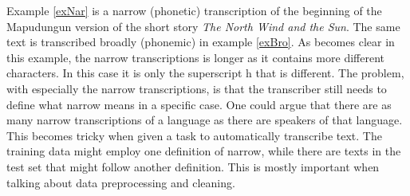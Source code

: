 Example \ref{exNar} is a narrow (phonetic) transcription of the beginning of the Mapudungun version of the short story \textit{The North Wind and the Sun}. The same text is transcribed broadly (phonemic) in example \ref{exBro}. As becomes clear in this example, the narrow transcriptions is longer as it contains more different characters. In this case it is only the superscript h that is different. The problem, with especially the narrow transcriptions, is that the transcriber still needs to define what narrow means in a specific case. One could argue that there are as many narrow transcriptions of a language as there are speakers of that language. This becomes tricky when given a task to automatically transcribe text. The training data might employ one definition of narrow, while there are texts in the test set that might follow another definition. This is mostly important when talking about data preprocessing and cleaning.
  



